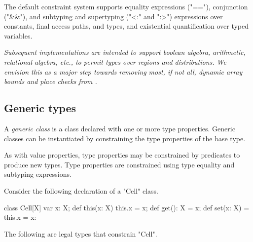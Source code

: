 \fi

The default \Xten{} constraint system supports equality expressions
(\xcd"=="), conjunction (\xcd"&&"), and subtyping and supertyping (\xcd"<:" and
\xcd":>") expressions over constants, final access paths, and
types, and existential quantification over typed variables.

\emph{
Subsequent implementations are intended to support boolean algebra,
arithmetic, relational algebra, etc., to permit types over regions and
distributions. We envision this as a major step towards removing most,
if not all, dynamic array bounds and place checks from \Xten{}.
}


\iftypeparams
\else

\subsection{Generic types}
\label{Generics}
        A {\em generic class} is a class
        declared with one or more type properties.  Generic
        classes can be instantiated by constraining the type
        properties of the base type.

As with value properties, type properties may be constrained
by predicates to produce new types.
Type properties are constrained using type equality and
subtyping expressions.

Consider the following declaration of a \xcd"Cell" class.
\begin{xten}
class Cell[X] {
    var x: X;
    def this(x: X) { this.x = x; }
    def get(): X = x;
    def set(x: X) = { this.x = x: }
}
\end{xten}
The following are legal types that constrain \xcd"Cell".

